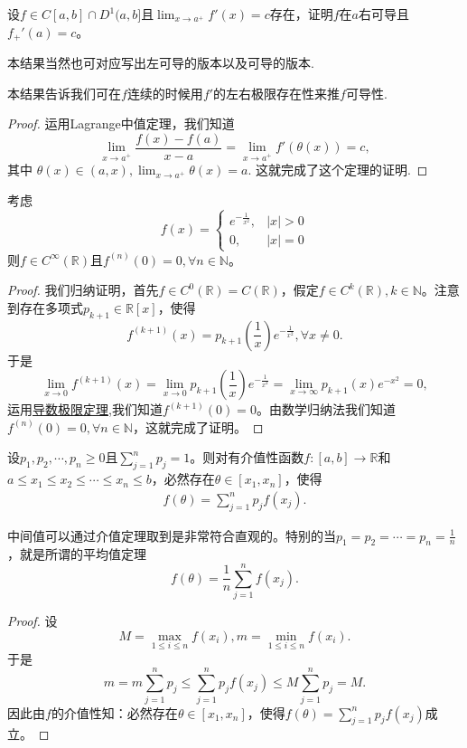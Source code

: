 \documentclass[lang=cn,newtx,10pt,scheme=chinese]{elegantbook}
\begin{document}
\begin{theorem}[导数极限定理]\label{theorem:导数极限定理}
   设\(f\in C[a,b]\cap D^{1}(a,b]\)且\(\lim_{x\rightarrow a^{+}}f'(x)=c\)存在，证明\(f\)在\(a\)右可导且\(f_{+}'(a)=c\)。
\end{theorem}
\begin{remark}
   本结果当然也可对应写出左可导的版本以及可导的版本.
\end{remark}
\begin{note}
本结果告诉我们可在\(f\)连续的时候用\(f'\)的左右极限存在性来推\(f\)可导性.
\end{note}
\begin{proof}
   运用Lagrange中值定理，我们知道
\[\lim_{x\rightarrow a^{+}}\frac{f(x)-f(a)}{x - a}=\lim_{x\rightarrow a^{+}}f'(\theta(x))=c,\]
其中
\(\theta(x)\in(a,x),\lim_{x\rightarrow a^{+}}\theta(x)=a.\)
这就完成了这个定理的证明.
\end{proof}

\begin{example}[\,\,经典光滑函数]\label{example:经典光滑函数}
考虑
\[
f(x)=
\begin{cases}
e^{-\frac{1}{x^2}}, &|x|>0 \\
0, &|x| = 0
\end{cases}
\]
则\(f\in C^{\infty}(\mathbb{R})\)且\(f^{(n)}(0)=0,\forall n\in\mathbb{N}\)。
\end{example}
\begin{proof}
我们归纳证明，首先\(f\in C^{0}(\mathbb{R}) = C(\mathbb{R})\)，假定\(f\in C^{k}(\mathbb{R}),k\in\mathbb{N}\)。注意到存在多项式\(p_{k + 1}\in\mathbb{R}[x]\)，使得
\[
f^{(k + 1)}(x)=p_{k + 1}\left(\frac{1}{x}\right)e^{-\frac{1}{x^2}},\forall x\neq0.
\]
于是
\[
\lim_{x\rightarrow0}f^{(k + 1)}(x)=\lim_{x\rightarrow0}p_{k + 1}\left(\frac{1}{x}\right)e^{-\frac{1}{x^2}}=\lim_{x\rightarrow\infty}p_{k + 1}(x)e^{-x^2}=0,
\]
运用\hyperref[theorem:导数极限定理]{导数极限定理},我们知道\(f^{(k + 1)}(0)=0\)。由数学归纳法我们知道\(f^{(n)}(0)=0,\forall n\in\mathbb{N}\)，这就完成了证明。
\end{proof}

\begin{theorem}[连续函数中间值定理]\label{theorem:连续函数中间值定理}
设\(p_1,p_2,\cdots,p_n\geqslant0\)且\(\sum_{j = 1}^{n}p_j = 1\)。则对有介值性函数\(f:[a,b]\to\mathbb{R}\)和\(a\leqslant x_1\leqslant x_2\leqslant\cdots\leqslant x_n\leqslant b\)，必然存在\(\theta\in[x_1,x_n]\)，使得
\begin{align*}
   f(\theta)=\sum_{j = 1}^{n}p_jf(x_j).
\end{align*}
\end{theorem}
\begin{note}
   中间值可以通过介值定理取到是非常符合直观的。特别的当\(p_1 = p_2=\cdots=p_n=\frac{1}{n}\)，就是所谓的平均值定理
\[
f(\theta)=\frac{1}{n}\sum_{j = 1}^{n}f(x_j).
\]
\end{note}
\begin{proof}
   设
\[
M=\max_{1\leqslant i\leqslant n}f(x_i),m=\min_{1\leqslant i\leqslant n}f(x_i).
\]
于是
\[
m = m\sum_{j = 1}^{n}p_j\leqslant\sum_{j = 1}^{n}p_jf(x_j)\leqslant M\sum_{j = 1}^{n}p_j = M.
\]
因此由\(f\)的介值性知：必然存在\(\theta\in[x_1,x_n]\)，使得$f(\theta)=\sum_{j = 1}^{n}p_jf(x_j)$成立。
\end{proof}
\end{document}
